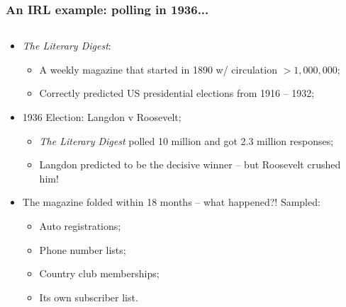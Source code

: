 \documentclass[aspectratio=169]{beamer}
\theoremstyle{principle}
\begin{document}
\begin{frame}
\frametitle{An IRL example: polling in 1936...}

\begin{columns}
\begin{column}{0.5\textwidth}

\begin{itemize}
\item \textit{The Literary Digest}:
\begin{itemize}
\item A weekly magazine that started in 1890 w/ circulation $> 1,000,000$;
\item Correctly predicted US presidential elections from 1916 -- 1932;
\end{itemize}

\item 1936 Election: Langdon v Roosevelt;
\begin{itemize}
\item \textit{The Literary Digest} polled 10 million and got 2.3 million responses;
\item Langdon predicted to be the decisive winner -- but Roosevelt crushed him!
\end{itemize}

\item The magazine folded within 18 months -- what happened?! \color{white} Sampled:
\begin{itemize}
\item[]\color{white} Auto registrations;
\item[]\color{white} Phone number lists;
\item[]\color{white} Country club memberships;
\item[]\color{white} Its own subscriber list.
\end{itemize}
\end{itemize}


\end{column}
\end{columns}
\end{frame}
\end{document}
